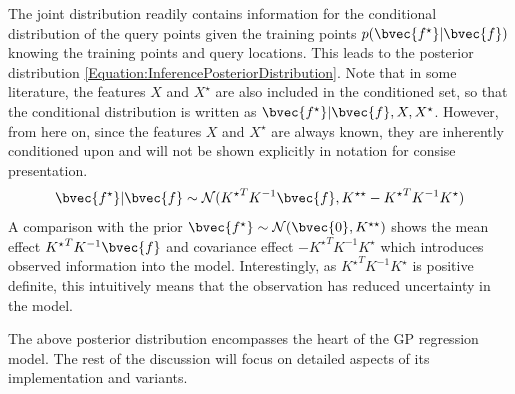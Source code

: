 				The joint distribution readily contains information for the conditional distribution of the query points given the training points $p(\bvec{f^{\star}} | \bvec{f})$ knowing the training points and query locations. This leads to the posterior distribution \eqref{Equation:InferencePosteriorDistribution}. Note that in some literature, the features $X$ and $X^{\star}$ are also included in the conditioned set, so that the conditional distribution is written as $\bvec{f^{\star}} | \bvec{f}, X, X^{\star}$. However, from here on, since the features $X$ and $X^{\star}$ are always known, they are inherently conditioned upon and will not be shown explicitly in notation for consise presentation. \begin{equation}
					\bvec{f^{\star}} | \bvec{f} \sim \mathcal{N}({K^{\star}}^{T} K^{-1} \bvec{f}, K^{\star \star} - {K^{\star}}^{T} K^{-1} K^{\star})
				\label{Equation:InferencePosteriorLatentDistribution}
				\end{equation} A comparison with the prior $\bvec{f^{\star}} \sim \mathcal{N}(\bvec{0}, K^{\star \star})$ shows the mean effect ${K^{\star}}^{T} K^{-1} \bvec{f}$ and covariance effect $- {K^{\star}}^{T} K^{-1} K^{\star}$ which introduces observed information into the model. Interestingly, as ${K^{\star}}^{T} K^{-1} K^{\star}$ is positive definite, this intuitively means that the observation has reduced uncertainty in the model.
				
				The above posterior distribution encompasses the heart of the GP regression model. The rest of the discussion will focus on detailed aspects of its implementation and variants.
				
